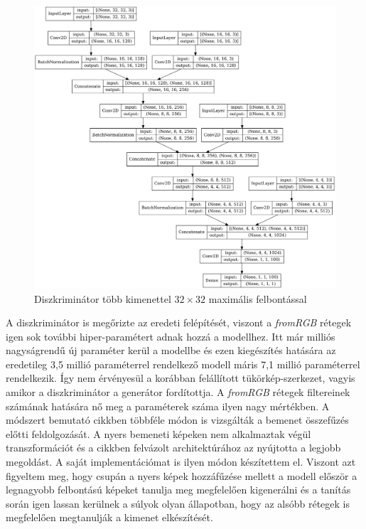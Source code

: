 \begin{figure}[h]
	\centering
	\includegraphics[width=15cm]{images/msgDiscriminator.png}
	\caption{Diszkriminátor több kimenettel $32 \times 32$ maximális felbontással}
	\label{fig:msgDiscriminator}
\end{figure}

A diszkriminátor is megőrizte az eredeti felépítését, viszont a \textit{fromRGB} rétegek igen sok további hiper-paramétert adnak hozzá a modellhez. Itt már milliós nagyságrendű új paraméter kerül a modellbe és ezen kiegészítés hatására az eredetileg 3,5 millió paraméterrel rendelkező modell máris 7,1 millió paraméterrel rendelkezik. Így nem érvényesül a korábban felállított tükörkép-szerkezet, vagyis amikor a diszkriminátor a generátor fordítottja. A \textit{fromRGB} rétegek filtereinek számának hatására nő meg a paraméterek száma ilyen nagy mértékben. A módszert bemutató cikkben többféle módon is vizsgálták a bemenet összefűzés előtti feldolgozását. A nyers bemeneti képeken nem alkalmaztak végül transzformációt és a cikkben felvázolt architektúrához az nyújtotta a legjobb megoldást. A saját implementációmat is ilyen módon készítettem el. Viszont azt figyeltem meg, hogy csupán a nyers képek hozzáfűzése mellett a modell először a legnagyobb felbontású képeket tanulja meg megfelelően kigenerálni és a tanítás során igen lassan kerülnek a súlyok olyan állapotban, hogy az alsóbb rétegek is megfelelően megtanulják a kimenet elkészítését.

